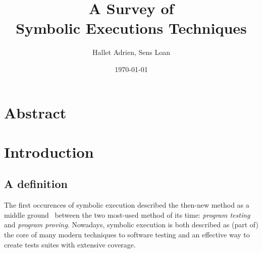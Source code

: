 \documentclass[11pt]{IEEEtran}
\begin{document}
\title{A Survey of\\Symbolic Executions Techniques} %
\author{Hallet Adrien, Sens Loan}
\date{\today}
\maketitle

  \section*{Abstract}

  \section{Introduction}
    \subsection{A definition}
      The first occurences of symbolic execution described the then-new method as a middle ground~\cite{newapproach} between the two most-used method of its time: \emph{program testing} and \emph{program proving}.
      Nowadays, symbolic execution is both described as (part of) the core of many modern techniques to software testing\cite{chopper:icse18} and an effective way to create tests suites with extensive coverage.\cite{threedecadeslater}
\end{document}
